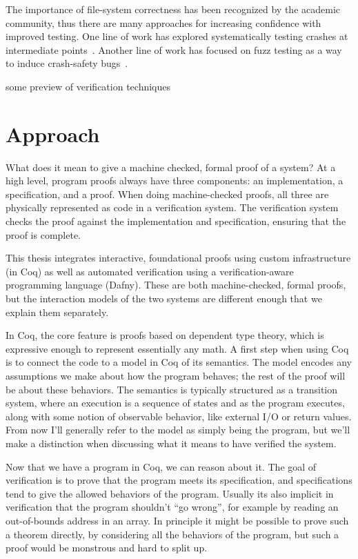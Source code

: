 The importance of file-system correctness has been recognized by the academic
community, thus there are many approaches for increasing confidence with
improved testing. One line of work has explored systematically testing crashes
at intermediate points~\cite{mohan:crashmonkey,pillai:appcrash}. Another line of
work has focused on fuzz testing as a way to induce crash-safety
bugs~\cite{xu:janus,kim:hydra}.

some preview of verification techniques

\section{Approach}

What does it mean to give a machine checked, formal proof of a system? At a high
level, program proofs always have three components: an implementation, a
specification, and a proof. When doing machine-checked proofs, all three are
physically represented as code in a verification system. The verification system
checks the proof against the implementation and specification, ensuring that the
proof is complete.

This thesis integrates interactive, foundational proofs using custom
infrastructure (in Coq) as well as automated verification using a
verification-aware programming language (Dafny). These are both machine-checked,
formal proofs, but the interaction models of the two systems are different
enough that we explain them separately.

In Coq, the core feature is proofs based on dependent type theory, which is
expressive enough to represent essentially any math. A first step when using Coq
is to connect the code to a model in Coq of its semantics. The model encodes any
assumptions we make about how the program behaves; the rest of the proof will be
about these behaviors. The semantics is typically structured as a transition
system, where an execution is a sequence of states and as the program executes,
along with some notion of observable behavior, like external I/O or return
values. From now I'll generally refer to the model as simply being the program,
but we'll make a distinction when discussing what it means to have verified
the system.

Now that we have a program in Coq, we can reason about it. The goal of
verification is to prove that the program meets its specification, and
specifications tend to give the allowed behaviors of the program. Usually its
also implicit in verification that the program shouldn't ``go wrong'', for
example by reading an out-of-bounds address in an array. In principle it might
be possible to prove such a theorem directly, by considering all the behaviors
of the program, but such a proof would be monstrous and hard to split up.


